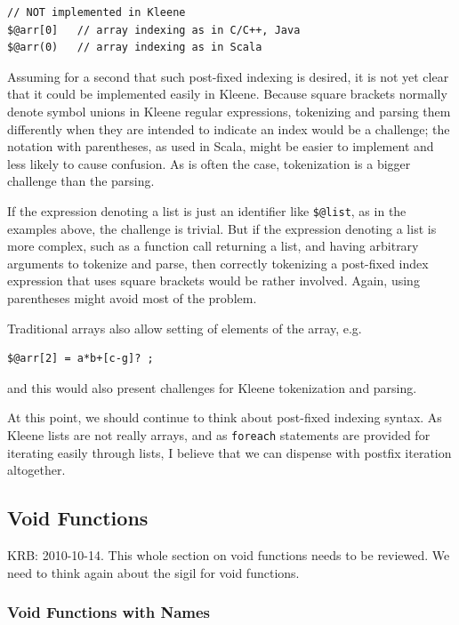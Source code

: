 \documentclass[letterpaper,12pt]{article}
\begin{document}
\begin{Verbatim}[fontsize=\small]
// NOT implemented in Kleene
$@arr[0]   // array indexing as in C/C++, Java
$@arr(0)   // array indexing as in Scala
\end{Verbatim}

\noindent
Assuming for a second that such post-fixed indexing is desired, it is not yet
clear that it could be implemented easily in Kleene.
Because square brackets normally denote symbol unions in Kleene regular
expressions, tokenizing and
parsing them differently when they are intended to indicate an index would be a
challenge; the notation with parentheses, as used in Scala, might be easier to
implement and
less likely to cause confusion.  As is often the case, tokenization is a bigger
challenge than the parsing.

If the expression denoting a list is just an
identifier like \verb!$@list!, as in the examples above, the challenge is trivial.  But if the
expression denoting a list is more complex, such as a function call returning a list,
and having arbitrary arguments to tokenize and parse, then correctly tokenizing a
post-fixed index expression that uses square brackets would be rather involved.
Again, using parentheses might avoid most of the problem.

Traditional arrays also allow setting of elements of the array, e.g.

\begin{Verbatim}[fontsize=\small]
$@arr[2] = a*b+[c-g]? ;
\end{Verbatim}

\noindent
and this would also present challenges for Kleene tokenization and parsing.

At this point, we should continue to think about post-fixed indexing
syntax.  As Kleene lists are not really arrays, and as \texttt{foreach}
statements are provided for iterating easily through lists, I believe
that we can dispense with postfix iteration altogether.


\subsection{Void Functions}

KRB:  2010-10-14.  This whole section on void functions needs to be
reviewed.  We need to think again about the sigil for void functions.

\subsubsection{Void Functions with Names}
\end{document}
